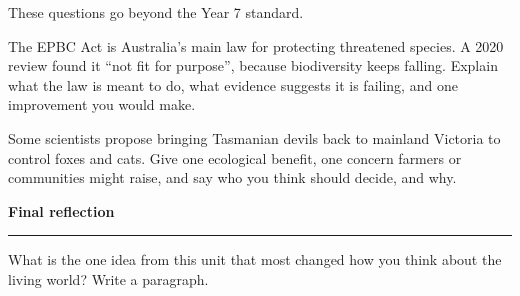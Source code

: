 \label{ext:11}

\begin{yr8box}
These questions go beyond the Year 7 standard.

\medskip
\begin{keepext}
\exttask The EPBC Act is Australia's main law for protecting threatened species. A 2020 review found it ``not fit for purpose'', because biodiversity keeps falling. Explain what the law is meant to do, what evidence suggests it is failing, and one improvement you would make.
\answerbox{6cm}
\end{keepext}
\begin{keepext}
\exttask Some scientists propose bringing Tasmanian devils back to mainland Victoria to control foxes and cats. Give one ecological benefit, one concern farmers or communities might raise, and say who you think should decide, and why.
\answerbox{6cm}
\end{keepext}
\end{yr8box}

\clearpage
{\headingfont\bfseries\Large Final reflection}\par\vspace{0.5mm}\noindent\rule{\linewidth}{0.6pt}\par\vspace{2mm}
What is the one idea from this unit that most changed how you think about the living world? Write a paragraph.
\answerbox{11cm}
